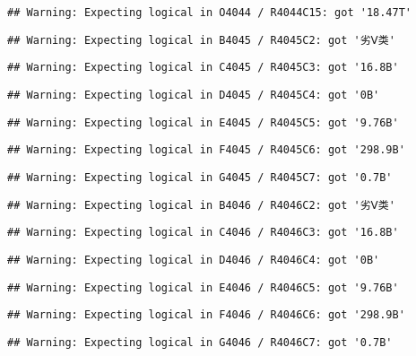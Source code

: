 \documentclass[
]{article}
\begin{document}
\begin{verbatim}
## Warning: Expecting logical in O4044 / R4044C15: got '18.47T'
\end{verbatim}

\begin{verbatim}
## Warning: Expecting logical in B4045 / R4045C2: got '劣Ⅴ类'
\end{verbatim}

\begin{verbatim}
## Warning: Expecting logical in C4045 / R4045C3: got '16.8B'
\end{verbatim}

\begin{verbatim}
## Warning: Expecting logical in D4045 / R4045C4: got '0B'
\end{verbatim}

\begin{verbatim}
## Warning: Expecting logical in E4045 / R4045C5: got '9.76B'
\end{verbatim}

\begin{verbatim}
## Warning: Expecting logical in F4045 / R4045C6: got '298.9B'
\end{verbatim}

\begin{verbatim}
## Warning: Expecting logical in G4045 / R4045C7: got '0.7B'
\end{verbatim}

\begin{verbatim}
## Warning: Expecting logical in B4046 / R4046C2: got '劣Ⅴ类'
\end{verbatim}

\begin{verbatim}
## Warning: Expecting logical in C4046 / R4046C3: got '16.8B'
\end{verbatim}

\begin{verbatim}
## Warning: Expecting logical in D4046 / R4046C4: got '0B'
\end{verbatim}

\begin{verbatim}
## Warning: Expecting logical in E4046 / R4046C5: got '9.76B'
\end{verbatim}

\begin{verbatim}
## Warning: Expecting logical in F4046 / R4046C6: got '298.9B'
\end{verbatim}

\begin{verbatim}
## Warning: Expecting logical in G4046 / R4046C7: got '0.7B'
\end{verbatim}
\end{document}
